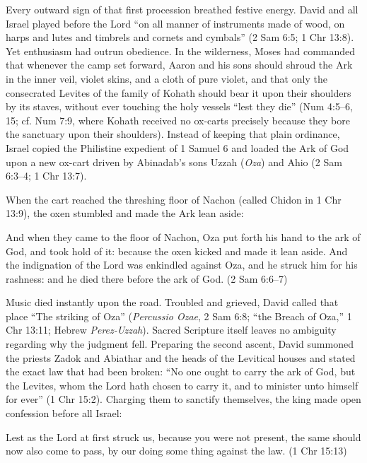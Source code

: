 Every outward sign of that first procession breathed festive energy. David and all Israel played before the Lord ``on all manner of instruments made of wood, on harps and lutes and timbrels and cornets and cymbals'' (2 Sam 6:5; 1 Chr 13:8). Yet enthusiasm had outrun obedience. In the wilderness, Moses had commanded that whenever the camp set forward, Aaron and his sons should shroud the Ark in the inner veil, violet skins, and a cloth of pure violet, and that only the consecrated Levites of the family of Kohath should bear it upon their shoulders by its staves, without ever touching the holy vessels ``lest they die'' (Num 4:5--6, 15; cf. Num 7:9, where Kohath received no ox-carts precisely because they bore the sanctuary upon their shoulders). Instead of keeping that plain ordinance, Israel copied the Philistine expedient of 1 Samuel 6 and loaded the Ark of God upon a new ox-cart driven by Abinadab's sons Uzzah (\textit{Oza}) and Ahio (2 Sam 6:3--4; 1 Chr 13:7).

When the cart reached the threshing floor of Nachon (called Chidon in 1 Chr 13:9), the oxen stumbled and made the Ark lean aside:

\begin{scriptureblock}
And when they came to the floor of Nachon, Oza put forth his hand to the ark of God, and took hold of it: because the oxen kicked and made it lean aside. And the indignation of the Lord was enkindled against Oza, and he struck him for his rashness: and he died there before the ark of God. \textnormal{(2 Sam 6:6--7)}
\end{scriptureblock}

Music died instantly upon the road. Troubled and grieved, David called that place ``The striking of Oza'' (\textit{Percussio Ozae}, 2 Sam 6:8; ``the Breach of Oza,'' 1 Chr 13:11; Hebrew \textit{Perez-Uzzah}). Sacred Scripture itself leaves no ambiguity regarding why the judgment fell. Preparing the second ascent, David summoned the priests Zadok and Abiathar and the heads of the Levitical houses and stated the exact law that had been broken: ``No one ought to carry the ark of God, but the Levites, whom the Lord hath chosen to carry it, and to minister unto himself for ever'' (1 Chr 15:2). Charging them to sanctify themselves, the king made open confession before all Israel:

\begin{scriptureblock}
Lest as the Lord at first struck us, because you were not present, the same should now also come to pass, by our doing some thing against the law. \textnormal{(1 Chr 15:13)}
\end{scriptureblock}

